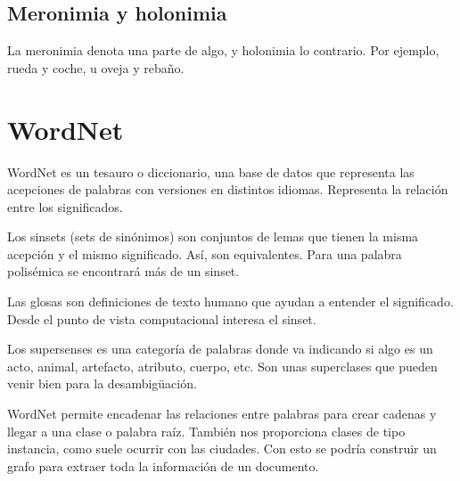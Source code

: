 \subsection{Meronimia y holonimia}
La meronimia denota una parte de algo, y holonimia lo contrario. Por ejemplo, rueda y coche, u oveja y rebaño.

\section{WordNet}

WordNet es un tesauro o diccionario, una base de datos que representa las acepciones de palabras con versiones en distintos idiomas. Representa la relación entre los significados. 

Los sinsets (sets de sinónimos) son conjuntos de lemas que tienen la misma acepción y el mismo significado. Así, son equivalentes. Para una palabra polisémica se encontrará más de un sinset.

Las glosas son definiciones de texto humano que ayudan a entender el significado. Desde el punto de vista computacional interesa el sinset.

Los supersenses es una categoría de palabras  donde va indicando si algo es un acto, animal, artefacto, atributo, cuerpo, etc. Son unas superclases que pueden venir bien para la desambigüación.

WordNet permite encadenar las relaciones entre palabras para crear cadenas y llegar a una clase o palabra raíz. También nos proporciona clases de tipo instancia, como suele ocurrir con las ciudades. Con esto se podría construir un grafo para extraer toda la información de un documento. 